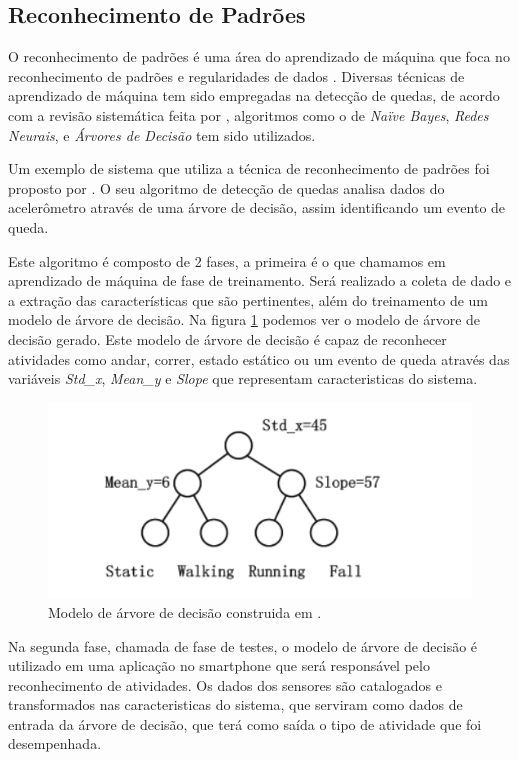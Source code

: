 \subsection{Reconhecimento de Padrões}
O reconhecimento de padrões é uma área do aprendizado de máquina que foca no reconhecimento de padrões e regularidades de dados \citep{anzai2012pattern}. Diversas técnicas de aprendizado de máquina tem sido empregadas na detecção de quedas, de acordo com a revisão sistemática feita por \cite{casilari2015analysis}, algoritmos como o de \textit{Naïve Bayes}, \textit{Redes Neurais}, e \textit{Árvores de Decisão} tem sido utilizados.


Um exemplo de sistema que utiliza a técnica de reconhecimento de padrões foi proposto por \cite{zhao2012fallalarm}. O seu algoritmo de detecção de quedas analisa dados do acelerômetro através de uma árvore de decisão, assim identificando um evento de queda. 

Este algoritmo é composto de 2 fases, a primeira é o que chamamos em aprendizado de máquina de fase de treinamento. Será realizado a coleta de dado e a  extração das características que são pertinentes, além do treinamento de um modelo de árvore de decisão. Na figura \ref{fig:decision_tree} podemos ver o modelo de árvore de decisão gerado.  Este modelo de árvore de decisão é capaz de reconhecer atividades como andar, correr, estado estático ou um evento de queda através das variáveis \textit{Std\_x}, \textit{Mean\_y} e \textit{Slope} que representam caracteristicas do sistema. 


\begin{figure}[ht]
	\centering
	\includegraphics[scale=0.6]{imagens/decision_tree.png}
	\caption{ Modelo de árvore de decisão construida em \cite{zhao2012fallalarm}.}
	\label{fig:decision_tree}
\end{figure} 


Na segunda fase, chamada de fase de testes, o modelo de árvore de decisão é utilizado em uma aplicação no smartphone que será responsável pelo reconhecimento de atividades. Os dados dos sensores são catalogados e transformados nas caracteristicas do sistema, que serviram como dados de entrada da árvore de decisão, que terá como saída o tipo de atividade que foi desempenhada.

